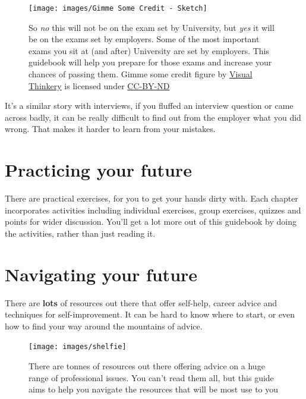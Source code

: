 \documentclass[
]{book}
\begin{document}
\begin{figure}

{\centering \texttt{[image: images/Gimme Some Credit - Sketch]} 

}

\caption{So \emph{no} this will not be on the exam set by University, but \emph{yes} it will be on the exams set by employers. Some of the most important exams you sit at (and after) University are set by employers. This guidebook will help you prepare for those exams and increase your chances of passing them. Gimme some credit figure by \href{https://visualthinkery.com/}{Visual Thinkery} is licensed under \href{https://creativecommons.org/licenses/by-nd/4.0/}{CC-BY-ND}}\label{fig:exam-fig}
\end{figure}



It's a similar story with interviews, if you fluffed an interview question or came across badly, it can be really difficult to find out from the employer what you did wrong. That makes it harder to learn from your mistakes.

\hypertarget{activities}{%
\section{Practicing your future}\label{activities}}

There are practical exercises, for you to get your hands dirty with. Each chapter incorporates activities including individual exercises, group exercises, quizzes and points for wider discussion. You'll get a lot more out of this guidebook by doing the activities, rather than just reading it.

\hypertarget{relatedwork}{%
\section{Navigating your future}\label{relatedwork}}

There are \textbf{lots} of resources out there that offer self-help, career advice and techniques for self-improvement. It can be hard to know where to start, or even how to find your way around the mountains of advice.

\begin{figure}

{\centering \texttt{[image: images/shelfie]} 

}

\caption{There are tonnes of resources out there offering advice on a huge range of professional issues. You can't read them all, but this guide aims to help you navigate the resources that will be most use to you}\label{fig:shelfie-fig}
\end{figure}
\end{document}
